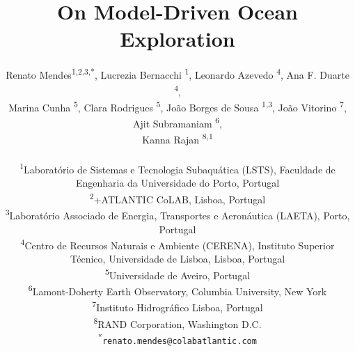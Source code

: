 \documentclass[11pt]{article}
\title{On Model-Driven Ocean Exploration}
\author{
Renato Mendes\textsuperscript{1,2,3,*},
Lucrezia Bernacchi \textsuperscript{1},
Leonardo Azevedo \textsuperscript{4},
Ana F. Duarte \textsuperscript{4},\\
Marina Cunha \textsuperscript{5},
Clara Rodrigues \textsuperscript{5},
João Borges de Sousa \textsuperscript{1,3},
João Vitorino \textsuperscript{7},\\
Ajit Subramaniam \textsuperscript{6},\\
Kanna Rajan \textsuperscript{8,1}
\\
\\
\textsuperscript{1}{\scriptsize Laboratório de Sistemas e Tecnologia Subaquática (LSTS), Faculdade de Engenharia da Universidade do Porto, Portugal}\\
\textsuperscript{2}{\scriptsize +ATLANTIC CoLAB, Lisboa, Portugal}\\
\textsuperscript{3}{\scriptsize Laboratório Associado de Energia, Transportes e Aeronáutica (LAETA), Porto, Portugal}\\
\textsuperscript{4}{\scriptsize Centro de Recursos Naturais e Ambiente (CERENA), Instituto Superior T\'{e}cnico, Universidade de Lisboa, Lisboa, Portugal}\\
\textsuperscript{5}{\scriptsize Universidade de Aveiro, Portugal}\\
\textsuperscript{6}{\scriptsize Lamont-Doherty Earth Observatory, Columbia University, New York}\\
\textsuperscript{7}{\scriptsize Instituto Hidrogr{\'a}fico Lisboa, Portugal}\\
\textsuperscript{8}{\scriptsize RAND Corporation, Washington D.C.}\\
\textsuperscript{*}\texttt{{\scriptsize renato.mendes@colabatlantic.com}}
}
\date{}
\begin{document}

\maketitle








\footnotesize{
  
}
\end{document}

